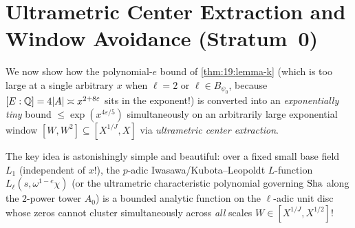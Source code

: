\section{Ultrametric Center Extraction and Window Avoidance (Stratum~0)}
\label{sec:19:window-avoidance}

We now show how the polynomial-$e$ bound of \cref{thm:19:lemma-k} (which is too large at a single arbitrary $x$ when $\ell = 2$ or $\ell \in B_{\psi_0}$, because $[E:\mathbb{Q}] = 4|A| \asymp x^{2+8\varepsilon}$ sits in the exponent!) is converted into an \emph{exponentially tiny} bound $\le \exp(x^{4\varepsilon/5})$ simultaneously on an arbitrarily large exponential window $[W, W^2] \subseteq [X^{1/J}, X]$ via \emph{ultrametric center extraction}.

The key idea is astonishingly simple and beautiful: over a fixed small base field $L_1$ (independent of $x$!), the $p$-adic Iwasawa/Kubota--Leopoldt $L$-function $L_\ell(s, \omega^{1-e}\chi)$ (or the ultrametric characteristic polynomial governing $\mathrm{Sha}$ along the $2$-power tower $A_0$) is a bounded analytic function on the $\ell$-adic unit disc whose zeros cannot cluster simultaneously across \emph{all} scales $W \in [X^{1/J}, X^{1/2}]$!

